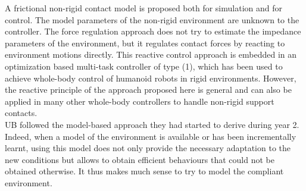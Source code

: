 A frictional non-rigid contact model is proposed both for simulation and for control. The model parameters of the non-rigid environment are unknown to the controller. The force regulation approach does not try to estimate the impedance parameters of the environment, but it regulates contact forces by reacting to environment motions directly. This reactive control approach is embedded in an optimization based multi-task controller of type (1), which has been used to achieve whole-body control of humanoid robots in rigid environments. However, the reactive principle of the approach proposed here is general and can also be applied in many other whole-body controllers to handle non-rigid support contacts.\\ %

UB followed the model-based approach they had started to derive during year 2. Indeed, when a model of the environment is available or has been incrementally learnt, using this model does not only provide the necessary adaptation to the new conditions but allows to obtain efficient behaviours that could not be obtained otherwise. It thus makes much sense to try to model the compliant environment.\\

